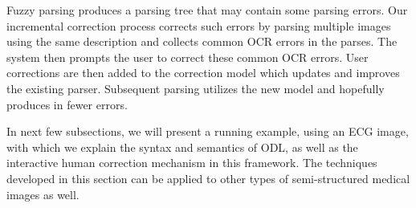 Fuzzy parsing produces a parsing tree 
that may contain some parsing errors. 
Our incremental correction process corrects such errors by
parsing multiple images using the same description and collects
common OCR errors in the parses.  
The system then prompts the user to correct these common OCR errors. 
User corrections are then added to the correction model 
which updates and improves the existing parser.
Subsequent parsing utilizes the new model 
and hopefully produces in fewer errors.





In next few subsections, we will present a running example, using
an ECG image, with
which we explain the syntax and semantics of ODL, 
as well as the interactive human correction mechanism in this framework.
The techniques developed in this section can be applied to 
other types of semi-structured medical images as well.

